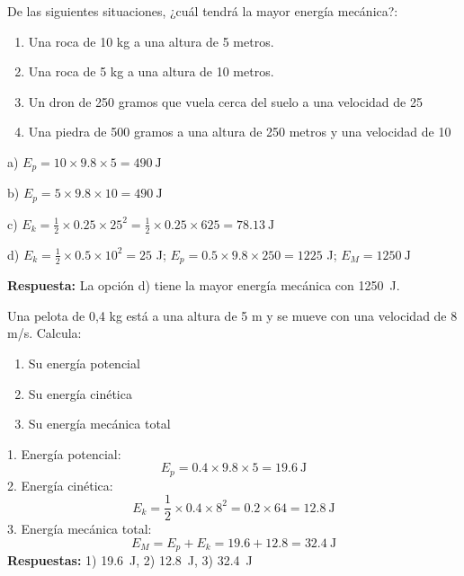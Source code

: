 \begin{exercise}
    De las siguientes situaciones, ¿cuál tendrá la mayor energía mecánica?:
    \begin{enumerate}[label=\alph*)]
\item Una roca de 10 kg a una altura de 5 metros.
\item Una roca de 5 kg a una altura de 10 metros.
\item Un dron de 250 gramos que vuela cerca del suelo a una velocidad de \qty{25}{\mps}
\item Una piedra de 500 gramos a una altura de 250 metros y una velocidad de \qty{10}{\mps}
    \end{enumerate}
    \begin{solu}
        a) $E_p = 10 \times 9.8 \times 5 = \qty{490}{\joule}$

        b) $E_p = 5 \times 9.8 \times 10 = \qty{490}{\joule}$

        c) $E_k = \frac{1}{2} \times 0.25 \times 25^2 = \frac{1}{2} \times 0.25 \times 625 = \qty{78.13}{\joule}$

        d) $E_k = \frac{1}{2} \times 0.5 \times 10^2 = 25$ J; $E_p = 0.5 \times 9.8 \times 250 = 1225$ J; $E_M = \qty{1250}{\joule}$

        \textbf{Respuesta:} La opción d) tiene la mayor energía mecánica con \qty{1250}{\joule}.
    \end{solu}
\end{exercise}

\begin{exercise}
    Una pelota de 0,4 kg está a una altura de 5 m y se mueve con una velocidad de 8 m/s. Calcula:
    \begin{enumerate}
        \item Su energía potencial
        \item Su energía cinética
        \item Su energía mecánica total
    \end{enumerate}
    \begin{solu}
        1. Energía potencial:
        \[
            E_p = 0.4 \times 9.8 \times 5 = \qty{19.6}{\joule}
        \]
        2. Energía cinética:
        \[
            E_k = \frac{1}{2} \times 0.4 \times 8^2 = 0.2 \times 64 = \qty{12.8}{\joule}
        \]
        3. Energía mecánica total:
        \[
            E_M = E_p + E_k = 19.6 + 12.8 = \qty{32.4}{\joule}
        \]
        \textbf{Respuestas:} 1) \qty{19.6}{\joule}, 2) \qty{12.8}{\joule}, 3) \qty{32.4}{\joule}
    \end{solu}
\end{exercise}

